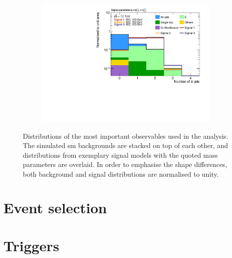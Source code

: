 \begin{figure}
\begin{subfigure}[b]{0.49\linewidth}
		\centering\includegraphics[width=\textwidth]{presel/nBJet}
		\caption{\label{fig:norm_nbjet}}
	\end{subfigure}
	\caption{Distributions of the most important observables used in the analysis. The simulated \gls{sm} backgrounds are stacked on top of each other, and distributions from exemplary signal models with the quoted mass parameters are overlaid. In order to emphasise the shape differences, both background and signal distributions are normalised to unity.}\label{fig:norm_obs}
\end{figure}

\section{Event selection}



\section{Triggers}